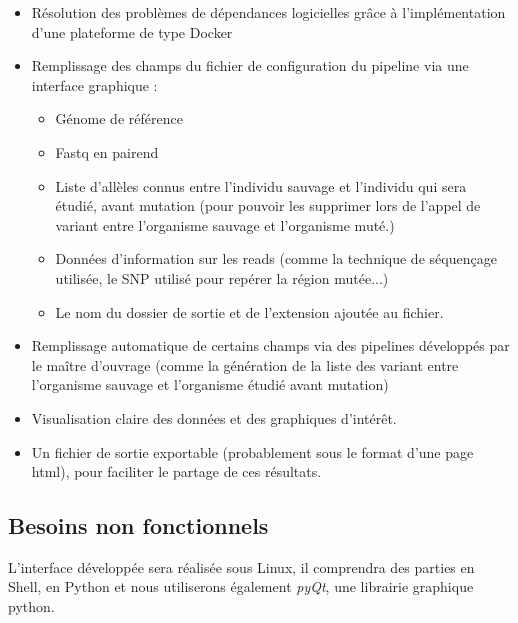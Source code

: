 \documentclass[12pt]{article}
\begin{document}
\begin{itemize}
\item Résolution des problèmes de dépendances logicielles grâce à l'implémentation d'une plateforme de type Docker
\item Remplissage des champs du fichier de configuration du pipeline via une interface graphique :
\begin{itemize}
\item Génome de référence
\item Fastq en pairend 
\item Liste d'allèles connus entre l'individu sauvage et l’individu qui sera étudié, avant mutation (pour pouvoir les supprimer lors de l'appel de variant entre l'organisme sauvage et l'organisme muté.)
\item Données d'information sur les reads (comme la technique de séquençage utilisée, le SNP utilisé pour repérer la région mutée...)
\item Le nom du dossier de sortie et de l’extension ajoutée au fichier.
\end{itemize}
\item Remplissage automatique de certains champs via des pipelines développés par le maître d'ouvrage (comme la génération de la liste des variant entre l'organisme sauvage et l'organisme étudié avant mutation)
\item Visualisation claire des données et des graphiques d’intérêt.
\item Un fichier de sortie exportable (probablement sous le format d'une page html), pour faciliter le partage de ces résultats. 
\end{itemize}



\subsection{Besoins non fonctionnels}

L'interface développée sera réalisée sous Linux, il comprendra des parties en Shell, en Python et nous utiliserons également \textit{pyQt}, une librairie graphique python.
\end{document}
